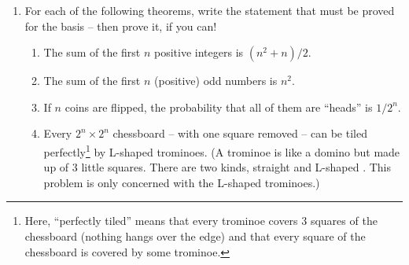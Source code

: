 \begin{enumerate}
\begin{proof}
\end{proof}
\medskip
   

\wbvfill

\workbookpagebreak
\hintspagebreak

\item For each of the following theorems, write the statement that must be
proved for the basis -- then prove it, if you can!

\begin{enumerate}
\item The sum of the first $n$ positive integers is $(n^2+n)/2$.


\wbvfill

\item The sum of the first $n$ (positive) odd numbers is $n^2$.


\wbvfill

\item If $n$ coins are flipped, the probability that all of them 
are ``heads'' is $1/2^n$.


\wbvfill

\item Every $2^n \times 2^n$ chessboard -- with one square removed -- can 
be tiled perfectly\footnote{Here, ``perfectly tiled'' means that every trominoe
covers 3 squares of the chessboard (nothing hangs over the edge) and that every
square of the chessboard is covered by some trominoe.} by L-shaped trominoes.  
(A trominoe is like a domino but 
made up of $3$ little squares.  There are two kinds, straight 
 and L-shaped 
.  This problem is only concerned with
the L-shaped trominoes.)
\end{enumerate}


\end{enumerate}

